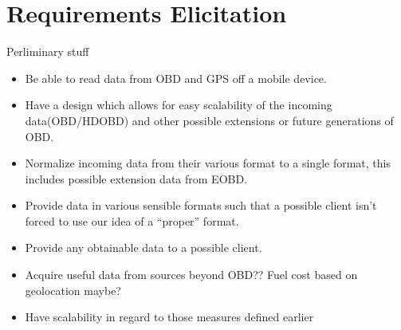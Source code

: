 \section{Requirements Elicitation}\label{sec:requirements_elicitation}
Perliminary stuff
\begin{itemize}
    \item Be able to read data from OBD and GPS off a mobile device.
    \item Have a design which allows for easy scalability of the incoming data(OBD/HDOBD) and other possible extensions or future generations of OBD.
    \item Normalize incoming data from their various format to a single format, this includes possible extension data from EOBD.
    \item Provide data in various sensible formats such that a possible client isn't forced to use our idea of a ``proper'' format.
    \item Provide any obtainable data to a possible client.
    \item Acquire useful data from sources beyond OBD?? Fuel cost based on geolocation maybe?
    \item Have scalability in regard to those measures defined earlier
\end{itemize}
